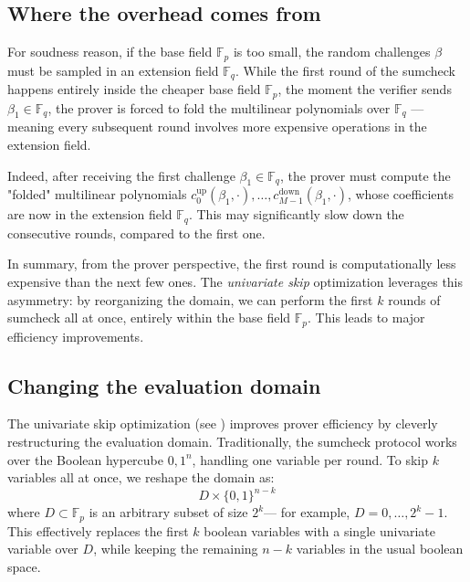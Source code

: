 \documentclass{article}
\newcommand{\Fp}{\mathbb F_p}
\newcommand{\Fq}{\mathbb F_q}
\begin{document}
\subsection{Where the overhead comes from}

For soudness reason, if the base field $\Fp$ is too small, the random challenges $\beta$ must be sampled in an extension field $\Fq$. While the first round of the sumcheck happens entirely inside the cheaper base field $\Fp$, the moment the verifier sends $\beta_1 \in \Fq$, the prover is forced to fold the multilinear polynomials over $\Fq$ —meaning every subsequent round involves more expensive operations in the extension field.


Indeed, after receiving the first challenge $\beta_1 \in \Fq$, the prover must compute the "folded" multilinear polynomials $c_0^{\text{up}}(\beta_1, \cdot), \dots, c_{M-1}^{\text{down}}(\beta_1, \cdot)$, whose coefficients are now in the extension field $\Fq$.
This may significantly slow down the consecutive rounds, compared to the first one.

In summary, from the prover perspective, the first round is computationally less expensive than the next few ones. The \emph{univariate skip} optimization\cite{univariate_skip} leverages this asymmetry: by reorganizing the domain, we can perform the first $k$ rounds of sumcheck all at once, entirely within the base field $\Fp$. This leads to major efficiency improvements.


\subsection{Changing the evaluation domain}

The univariate skip optimization (see \cite{univariate_skip}) improves prover efficiency by cleverly restructuring the evaluation domain. Traditionally, the sumcheck protocol works over the Boolean hypercube ${0,1}^n$, handling one variable per round. To skip $k$ variables all at once, we reshape the domain as:
\begin{equation}
    D \times \{0,1\}^{n - k}
\end{equation}
where $D \subset \Fp$ is an arbitrary subset of size $2^k$— for example, $D = {0, \dots, 2^k - 1}$. This effectively replaces the first $k$ boolean variables with a single univariate variable over $D$, while keeping the remaining $n - k$ variables in the usual boolean space.

\vspace{\baselineskip}
\end{document}
